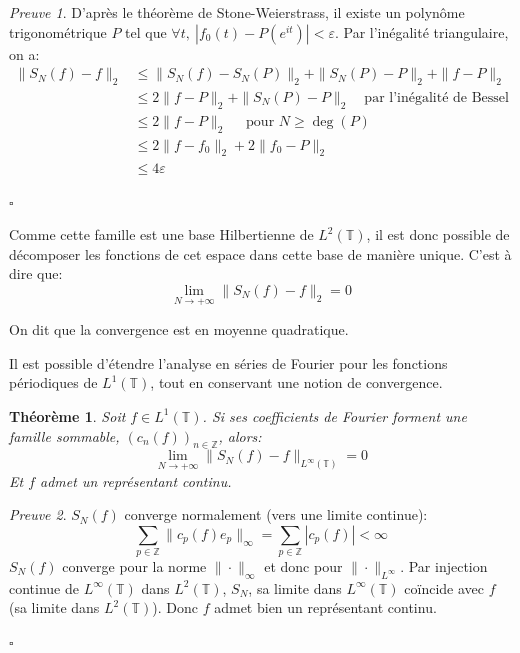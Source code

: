 \documentclass[]{article}
\newtheorem{mythm}{Théorème}
\theoremstyle{remark}
\newtheorem{myproof}{Preuve}
\theoremstyle{definition}
\newcommand{\cqfd}{
	\hfill$\square$
}
\begin{document}
\begin{myproof}
				D'après le théorème de Stone-Weierstrass, il existe un polynôme trigonométrique $P$ tel que $\forall t,  ~ |f_0(t) - P(e^{it})| < \varepsilon $.
				Par l'inégalité triangulaire, on a:
				\begin{align*}
					\| S_N(f) -f \|_2 &\leqslant \|S_N(f) - S_N(P)\|_2 + \| S_N(P) - P \|_2 + \| f- P \|_2 \\
				&	\leqslant 2 \| f - P\|_2 + \| S_N(P) - P\|_2 \quad \text{par l'inégalité de Bessel} \\
				& \leqslant 2 \| f - P\|_2 \quad \text{ pour } N\geqslant \deg(P) \\
				& \leqslant 2 \| f - f_0\|_2 + 2 \| f_0- P\|_2 \\
				& \leqslant 4 \varepsilon
				\end{align*}
				\cqfd
				
			\end{myproof}
			
		Comme cette famille est une base Hilbertienne de $L^2(\mathbb{T})$, il est donc possible de décomposer les fonctions de cet espace dans cette base de manière unique. C'est à dire que:
				$$ \lim_{N\to +\infty} \|S_N(f) -f \|_2 = 0 $$
				
		On dit que la convergence est en moyenne quadratique. 

	Il est possible d'étendre l'analyse en séries de Fourier pour les fonctions périodiques de $L^1(\mathbb{T})$, tout en conservant une notion de convergence. 
	
	\begin{mythm}
		Soit $f \in L^1(\mathbb{T})$. Si ses coefficients de Fourier forment une famille sommable, $(c_n(f))_{n\in\mathbb{Z}} $, alors: 
		$$ \lim_{N\to +\infty} \|S_N(f) -f \|_{L^\infty(\mathbb{T})} = 0 $$ 
		Et $f$ admet un représentant continu. 

	\end{mythm}
			
	\begin{myproof}

		$S_N(f)$ converge normalement (vers une limite continue): 
		$$ \sum_{p \in \mathbb{Z}} \|c_p(f)e_p\|_\infty = \sum_{p \in \mathbb{Z}} |c_p(f)| < \infty $$
		$S_N(f)$ converge pour la norme $\| \cdot \|_\infty $ et donc pour $\| \cdot \|_{L^{\infty}} $.
		Par injection continue de $L^\infty(\mathbb{T})$ dans $L^2(\mathbb{T})$, $S_N$, sa limite dans $L^\infty(\mathbb{T})$ coïncide avec $f$ (sa limite dans $L^2(\mathbb{T})$). Donc $f$ admet bien un représentant continu. 
		
		\cqfd
	\end{myproof}
	
\end{document}
